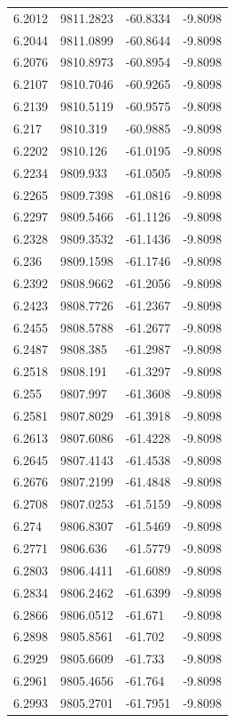 \begin{table}[H]
\begin{tabular}{llll}
6.2012 & 9811.2823 & -60.8334 & -9.8098 \\
6.2044 & 9811.0899 & -60.8644 & -9.8098 \\
6.2076 & 9810.8973 & -60.8954 & -9.8098 \\
6.2107 & 9810.7046 & -60.9265 & -9.8098 \\
6.2139 & 9810.5119 & -60.9575 & -9.8098 \\
6.217 & 9810.319 & -60.9885 & -9.8098 \\
6.2202 & 9810.126 & -61.0195 & -9.8098 \\
6.2234 & 9809.933 & -61.0505 & -9.8098 \\
6.2265 & 9809.7398 & -61.0816 & -9.8098 \\
6.2297 & 9809.5466 & -61.1126 & -9.8098 \\
6.2328 & 9809.3532 & -61.1436 & -9.8098 \\
6.236 & 9809.1598 & -61.1746 & -9.8098 \\
6.2392 & 9808.9662 & -61.2056 & -9.8098 \\
6.2423 & 9808.7726 & -61.2367 & -9.8098 \\
6.2455 & 9808.5788 & -61.2677 & -9.8098 \\
6.2487 & 9808.385 & -61.2987 & -9.8098 \\
6.2518 & 9808.191 & -61.3297 & -9.8098 \\
6.255 & 9807.997 & -61.3608 & -9.8098 \\
6.2581 & 9807.8029 & -61.3918 & -9.8098 \\
6.2613 & 9807.6086 & -61.4228 & -9.8098 \\
6.2645 & 9807.4143 & -61.4538 & -9.8098 \\
6.2676 & 9807.2199 & -61.4848 & -9.8098 \\
6.2708 & 9807.0253 & -61.5159 & -9.8098 \\
6.274 & 9806.8307 & -61.5469 & -9.8098 \\
6.2771 & 9806.636 & -61.5779 & -9.8098 \\
6.2803 & 9806.4411 & -61.6089 & -9.8098 \\
6.2834 & 9806.2462 & -61.6399 & -9.8098 \\
6.2866 & 9806.0512 & -61.671 & -9.8098 \\
6.2898 & 9805.8561 & -61.702 & -9.8098 \\
6.2929 & 9805.6609 & -61.733 & -9.8098 \\
6.2961 & 9805.4656 & -61.764 & -9.8098 \\
6.2993 & 9805.2701 & -61.7951 & -9.8098 \\

\end{tabular}
\end{table}
